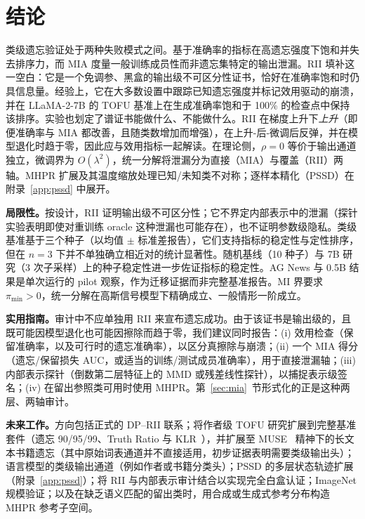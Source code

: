 \section{结论}
\label{sec:conclusion}

类级遗忘验证处于两种失败模式之间。基于准确率的指标在高遗忘强度下饱和并失去排序力，而 MIA 度量一般训练成员性而非遗忘集特定的输出泄漏。RII 填补这一空白：它是一个免调参、黑盒的输出级不可区分性证书，恰好在准确率饱和时仍具信息量。经验上，它在大多数设置中跟踪已知遗忘强度并标记效用驱动的崩溃，并在 LLaMA-2-7B 的 TOFU 基准上在生成准确率饱和于 100\% 的检查点中保持该排序。实验也划定了谱证书能做什么、不能做什么。RII 在梯度上升下\emph{上升}（即便准确率与 MIA 都改善，且随类数增加而增强），在上升-后-微调后反弹，并在模型退化时趋于零，因此应与效用指标一起解读。在理论侧，$\rho=0$ 等价于输出通道独立，微调界为 $O(\lambda^2)$，统一分解将泄漏分为直接（MIA）与覆盖（RII）两轴。MHPR 扩展及其温度缩放处理已知/未知类不对称；逐样本精化（PSSD）在附录~\ref{app:pssd} 中展开。

\textbf{局限性。}按设计，RII 证明输出级不可区分性；它不界定内部表示中的泄漏（探针实验表明即使对重训练 oracle 这种泄漏也可能存在），也不证明参数级隐私。类级基准基于三个种子（以均值 $\pm$ 标准差报告），它们支持指标的稳定性与定性排序，但在 $n{=}3$ 下并不单独确立相近对的统计显著性。随机基线（10 种子）与 7B 研究（3 次子采样）上的种子稳定性进一步佐证指标的稳定性。AG News 与 0.5B 结果是单次运行的 pilot 观察，作为迁移证据而非完整基准报告。MI 界要求 $\pi_{\min}>0$，统一分解在高斯信号模型下精确成立、一般情形一阶成立。

\textbf{实用指南。}审计中不应单独用 RII 来宣布遗忘成功。由于该证书是输出级的，且既可能因模型退化也可能因擦除而趋于零，我们建议同时报告：(i) 效用检查（保留准确率，以及可行时的遗忘准确率），以区分真擦除与崩溃；(ii) 一个 MIA 得分（遗忘/保留损失 AUC，或适当的训练/测试成员准确率），用于直接泄漏轴；(iii) 内部表示探针（倒数第二层特征上的 MMD 或残差线性探针），以捕捉表示级签名；(iv) 在留出参照类可用时使用 MHPR。第~\ref{sec:mia}~节形式化的正是这种两层、两轴审计。

\textbf{未来工作。}方向包括正式的 DP--RII 联系；将作者级 TOFU 研究扩展到完整基准套件（遗忘 90/95/99、Truth Ratio 与 KLR~\cite{maini2024tofu}），并扩展至 MUSE~\cite{shi2024muse} 精神下的长文本书籍遗忘（其中原始词表通道并不直接适用，初步证据表明需要类级输出头）；语言模型的类级输出通道（例如作者或书籍分类头）；PSSD 的多层状态轨迹扩展（附录~\ref{app:pssd}）；将 RII 与内部表示审计结合以实现完全白盒认证；ImageNet 规模验证；以及在缺乏语义匹配的留出类时，用合成或生成式参考分布构造 MHPR 参考子空间。
